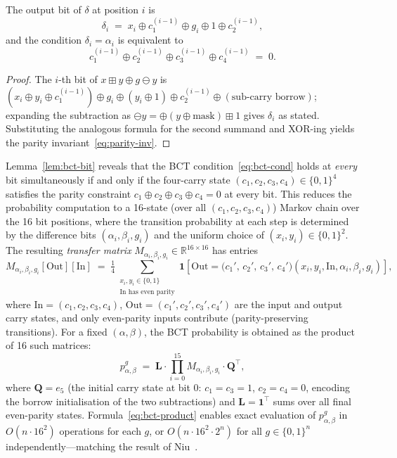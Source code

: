 \documentclass[runningheads]{llncs}
\newcommand{\xor}{\oplus}
\begin{document}
\begin{lemma}
  \label{lem:bct-bit}
  The output bit of $\delta$ at position $i$ is
  \[
    \delta_i \;=\; x_i \xor c_1^{(i-1)} \xor g_i \xor 1 \xor c_2^{(i-1)},
  \]
  and the condition $\delta_i = \alpha_i$ is equivalent to
  \begin{equation}
    \label{eq:parity-inv}
    c_1^{(i-1)} \xor c_2^{(i-1)} \xor c_3^{(i-1)} \xor c_4^{(i-1)} \;=\; 0.
  \end{equation}
\end{lemma}

\begin{proof}
  The $i$-th bit of $x \boxplus y \xor g \ominus y$ is
  $(x_i \xor y_i \xor c_1^{(i-1)}) \xor g_i \xor (y_i \xor 1) \xor c_2^{(i-1)} \xor (\text{sub-carry borrow})$;
  expanding the subtraction as $\ominus y = \xor (y \xor \text{mask}) \boxplus 1$
  gives $\delta_i$ as stated.  Substituting the analogous formula for the
  second summand and XOR-ing yields the parity invariant~\eqref{eq:parity-inv}.
\end{proof}

Lemma~\ref{lem:bct-bit} reveals that the BCT condition~\eqref{eq:bct-cond}
holds at \emph{every} bit simultaneously if and only if the four-carry state
$(c_1, c_2, c_3, c_4) \in \{0,1\}^4$ satisfies the parity constraint
$c_1 \xor c_2 \xor c_3 \xor c_4 = 0$ at every bit.  This reduces the
probability computation to a 16-state (over all $(c_1, c_2, c_3, c_4)$)
Markov chain over the 16 bit positions, where the transition probability at
each step is determined by the difference bits $(\alpha_i, \beta_i, g_i)$
and the uniform choice of $(x_i, y_i) \in \{0,1\}^2$.
The resulting \emph{transfer matrix} $M_{\alpha_i, \beta_i, g_i} \in
\mathbb{R}^{16 \times 16}$ has entries
\begin{equation}
  \label{eq:M-entries}
  M_{\alpha_i, \beta_i, g_i}[\mathrm{Out}][\mathrm{In}]
  \;=\;
  \tfrac{1}{4}
  \sum_{\substack{x_i, y_i \in \{0,1\} \\ \text{In has even parity}}}
  \mathbf{1}\!\left[\mathrm{Out}
  = \bigl(c_1',\, c_2',\, c_3',\, c_4'\bigr)(x_i, y_i, \mathrm{In},
            \alpha_i, \beta_i, g_i)\right],
\end{equation}
where $\mathrm{In} = (c_1, c_2, c_3, c_4)$, $\mathrm{Out} = (c_1', c_2',
c_3', c_4')$ are the input and output carry states, and only even-parity
inputs contribute (parity-preserving transitions).
For a fixed $(\alpha, \beta)$, the BCT probability is obtained as the
product of 16 such matrices:
\begin{equation}
  \label{eq:bct-product}
  p_{\alpha,\beta}^g
  \;=\;
  \mathbf{L} \cdot \prod_{i=0}^{15} M_{\alpha_i, \beta_i, g_i} \cdot
  \mathbf{Q}^{\top},
\end{equation}
where $\mathbf{Q} = e_5$ (the initial carry state at bit 0: $c_1 = c_3 = 1$,
$c_2 = c_4 = 0$, encoding the borrow initialisation of the two subtractions)
and $\mathbf{L} = \mathbf{1}^{\top}$ sums over all final even-parity states.
Formula~\eqref{eq:bct-product} enables exact evaluation of $p_{\alpha,\beta}^g$
in $O(n \cdot 16^2)$ operations for each $g$, or $O(n \cdot 16^2 \cdot 2^n)$
for all $g \in \{0,1\}^n$ independently—matching the result of Niu~\cite{Niu21}.
\end{document}
